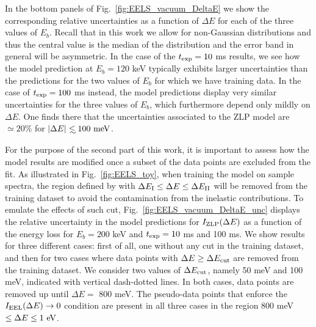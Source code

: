 In the bottom panels of Fig.~\ref{fig:EELS_vacuum_DeltaE} we show
the corresponding relative uncertainties as a function of $\Delta E$
for each of the three values of $E_b$.
%
Recall that in this work we allow for non-Gaussian distributions and thus the central
value is the median of the distribution and the error band in general will
be asymmetric.
%
In the case of the $t_{\rm exp}=10$ ms results, we see how the model prediction
at $E_b=120$ keV typically exhibits larger uncertainties than the predictions
for the two values of $E_b$ for which we have training data.
%
In the case of $t_{\rm exp}=100$ ms instead, the model predictions display very similar
uncertainties for the three values of $E_b$, which furthermore depend only mildly on $\Delta E$.
%
One finds there that the uncertainties associated to the ZLP model are $\simeq 20\%$
for $|\Delta E| \lsim 100~{\rm meV}$.



For the purpose of the second part of this work, it is important
to assess how the model results are modified once a subset of the data points
are excluded from the fit.
%
As illustrated in Fig.~\ref{fig:EELS_toy}, when training the model on sample spectra, the
region defined by
with $\Delta E_{\rm I} \le \Delta E \le \Delta E_{\rm II}$ will be removed from the training dataset to avoid the
contamination from the inelastic contributions.
%
To emulate the effects of such cut, 
Fig.~\ref{fig:EELS_vacuum_DeltaE_unc} displays
the relative uncertainty in the model predictions for $I_{\rm ZLP}(\Delta E)$
as a function of the energy loss for $E_b=200$ keV and $t_{\rm exp}=10$ ms 
and 100 ms.
%
We show results for three different cases: first of all, one without any cut
in the training dataset, and then for two cases where data points with $\Delta E \ge \Delta E_{\rm cut}$
are removed from the training dataset.
%
We consider two values of $\Delta E_{\rm cut}$, namely 50 meV and 100 meV, indicated
with vertical dash-dotted lines.
%
In both cases, data points are removed up until $\Delta E =$ 800 meV. The pseudo-data points 
that enforce the $I_{\rm EEL}(\Delta E)\to 0$ condition are present
in all three cases in the region 800 meV $\le \Delta E \le 1~{\rm eV}$. 


